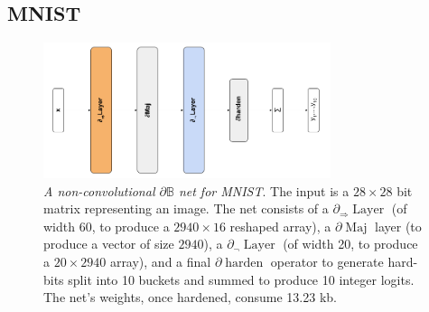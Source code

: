 \documentclass{article}
\theoremstyle{plain}
\theoremstyle{definition}
\theoremstyle{remark}
\begin{document}
\subsection{MNIST}

\begin{figure}
	\centering
	\includegraphics[width=0.75\textwidth]{../mnist-architecture.png}
	\caption{{\em A non-convolutional $\partial\mathbb{B}$ net for MNIST}. The input is a $28\times28$ bit matrix representing an image. The net consists of a $\partial_{\Rightarrow}\!\operatorname{Layer}$ (of width 60, to produce a $2940\times16$ reshaped array), a $\partial\!\operatorname{Maj}$ layer (to produce a vector of size $2940$), a $\partial_{\neg}\!\operatorname{Layer}$ (of width 20, to produce a $20 \times 2940$ array), and a final $\partial\!\operatorname{harden}$ operator to generate hard-bits split into 10 buckets and summed to produce 10 integer logits. The net's weights, once hardened, consume 13.23 kb.}
	\label{fig:mnist-architecture}
\end{figure}
\end{document}
